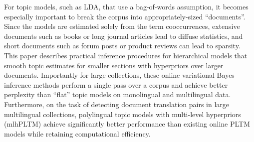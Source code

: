 For topic models, such as LDA, that use a bag-of-words assumption, it becomes especially important to break the corpus into appropriately-sized ``documents''. Since the models are estimated solely from the term cooccurrences, extensive documents such as books or long journal articles lead to diffuse statistics, and short documents such as forum posts or product reviews can lead to sparsity. This paper describes practical inference procedures for hierarchical models that smooth topic estimates for smaller sections with hyperpriors over larger documents. Importantly for large collections, these online variational Bayes inference methods perform a single pass over a corpus and achieve better perplexity than ``flat'' topic models on monolingual and multilingual data. Furthermore, on the task of detecting document translation pairs in large multilingual collections, polylingual topic models with multi-level hyperpriors (mlhPLTM) achieve significantly better performance than existing online PLTM models while retaining computational efficiency.

